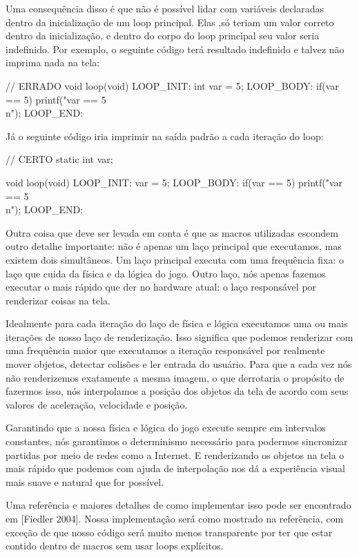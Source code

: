 Uma consequência disso é que não é possível lidar com variáveis
declaradas dentro da inicialização de um loop principal. Elas ,só
teriam um valor correto dentro da inicialização, e dentro do corpo do
loop principal seu valor seria indefinido. Por exemplo, o seguinte
código terá resultado indefinido e talvez não imprima nada na tela:

\alinhaverbatim
// ERRADO
void loop(void){
LOOP\_INIT:
  int var = 5;
LOOP\_BODY:
  if(var == 5)
    printf("var == 5\\n");
LOOP\_END:
}
\alinhanormal

Já o seguinte código iria imprimir na saída padrão a cada iteração do
loop:

\alinhaverbatim
// CERTO
static int var;

void loop(void){
LOOP\_INIT:
  var = 5;
LOOP\_BODY:
  if(var == 5)
    printf("var == 5\\n");
LOOP\_END:
}
\alinhanormal

Outra coisa que deve ser levada em conta é que as macros utilizadas
escondem outro detalhe importante: não é apenas um laço principal que
executamos, mas existem dois simultâneos. Um laço principal executa
com uma frequência fixa: o laço que cuida da física e da lógica do
jogo. Outro laço, nós apenas fazemos executar o mais rápido que der no
hardware atual: o laço responsável por renderizar coisas na tela.

Idealmente para cada iteração do laço de física e lógica executamos uma
ou mais iterações de nosso laço de renderização. Isso significa que
podemos renderizar com uma frequência maior que executamos a iteração
responsável por realmente mover objetos, detectar colisões e ler
entrada do usuário. Para que a cada vez nós não renderizemos
exatamente a mesma imagem, o que derrotaria o propósito de fazermos
isso, nós interpolamos a posição dos objetos da tela de acordo com
seus valores de aceleração, velocidade e posição.

Garantindo que a nossa física e lógica do jogo execute sempre em
intervalos constantes, nós garantimos o determinismo necessário para
podermos sincronizar partidas por meio de redes como a Internet. E
renderizando os objetos na tela o mais rápido que podemos com ajuda de
interpolação nos dá a experiência visual mais suave e natural que for
possível.

Uma referência e maiores detalhes de como implementar isso pode ser
encontrado em [Fiedler 2004]. Nossa implementação será como mostrado
na referência, com exceção de que nosso código será muito menos
transparente por ter que estar contido dentro de macros sem usar loops
explícitos.

